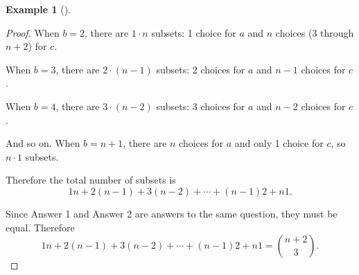 \documentclass[10pt,]{book}
\theoremstyle{plain}
\theoremstyle{definition}
\newtheorem{example}[theorem]{Example}
\theoremstyle{definition}
\theoremstyle{definition}
\numberwithin{equation}{section}
\begin{document}
\begin{example}[]
\begin{proof}
            When \(b = 2\), there are \(1 \cdot n\) subsets: 1 choice for \(a\) and \(n\) choices (3 through \(n+2\)) for \(c\).
\par

            When \(b = 3\), there are \(2 \cdot (n-1)\) subsets: 2 choices for \(a\) and \(n-1\) choices for \(c\).
\par

            When \(b = 4\), there are \(3 \cdot (n-2)\) subsets: 3 choices for \(a\) and \(n-2\) choices for \(c\).
\par

            And so on. When \(b = n+1\), there are \(n\) choices for \(a\) and only 1 choice for \(c\), so \(n \cdot 1\) subsets.
\par

            Therefore the total number of subsets is
            \begin{equation*}
              1 n + 2 (n-1) + 3 (n-2) + \cdots + (n-1)2 + n 1.
            \end{equation*}
\par

            Since Answer 1 and Answer 2 are answers to the same question, they must be equal. Therefore
            \begin{equation*}
              1 n + 2 (n-1) + 3 (n-2) + \cdots + (n-1) 2 + n 1 = {n+2 \choose 3}.
            \end{equation*}
\end{proof}
\end{example}
\end{document}
